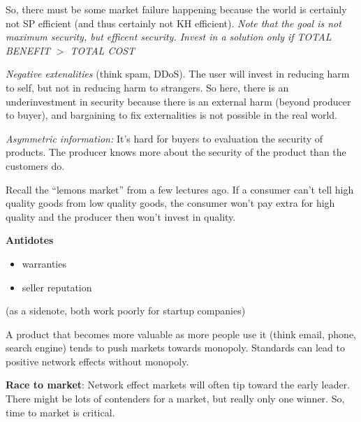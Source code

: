 So, there must be some market failure happening because the world is certainly not SP efficient (and thus certainly not KH efficient). \textit{Note that the goal is not maximum security, but efficent security. Invest in a solution only if TOTAL BENEFIT $>$ TOTAL COST}

\textit{Negative extenalities} (think spam, DDoS). The user will invest in reducing harm to self, but not in reducing harm to strangers. So here, there is an underinvestment in security because there is an external harm (beyond producer to buyer), and bargaining to fix externalities is not possible in the real world.

\textit{Asymmetric information:} It's hard for buyers to evaluation the security of products. The producer knows more about the security of the product than the customers do.

Recall the ``lemons market'' from a few lectures ago. If a consumer can't tell high quality goods from low quality goods, the consumer won't pay extra for high quality and the producer then won't invest in quality. 

\textbf{Antidotes} 
\begin{itemize}
	\item warranties
	\item seller reputation
\end{itemize}
(as a sidenote, both work poorly for startup companies)

A product that becomes more valuable as more people use it (think email, phone, search engine) tends to push markets towards monopoly. Standards can lead to positive network effects without monopoly. 



\textbf{Race to market}: Network effect markets will often tip toward the early leader. There might be lots of contenders for a market, but really only one winner. So, time to market is critical. 

